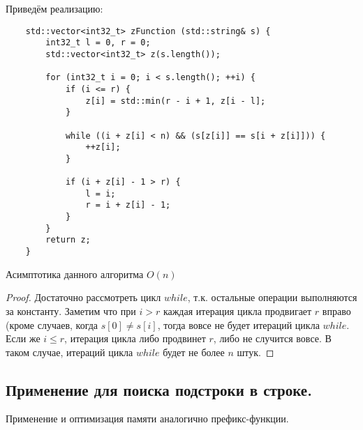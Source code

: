 Приведём реализацию:

\begin{lstlisting}
	std::vector<int32_t> zFunction (std::string& s) {
		int32_t l = 0, r = 0;
		std::vector<int32_t> z(s.length());

		for (int32_t i = 0; i < s.length(); ++i) {
			if (i <= r) {
				z[i] = std::min(r - i + 1, z[i - l];
			}
			
			while ((i + z[i] < n) && (s[z[i]] == s[i + z[i]])) {
				++z[i];
			}

			if (i + z[i] - 1 > r) {
				l = i;
				r = i + z[i] - 1;
			}
		}
		return z;
	}
\end{lstlisting}

\begin{remark}
	Асимптотика данного алгоритма $O(n)$
\end{remark}

\begin{proof}
	Достаточно рассмотреть цикл $while$, т.к. остальные операции выполняются за константу. Заметим что при
	$i > r$ каждая итерация цикла продвигает $r$ вправо (кроме случаев, когда $s[0] \neq s[i]$, тогда
	вовсе не будет итераций цикла $while$. Если же $i \leq r$, итерация цикла либо продвинет $r$, либо
	не случится вовсе. В таком случае, итераций цикла $while$ будет не более $n$ штук.
\end{proof}

\subsection{Применение для поиска подстроки в строке.}

Применение и оптимизация памяти аналогично префикс-функции.
